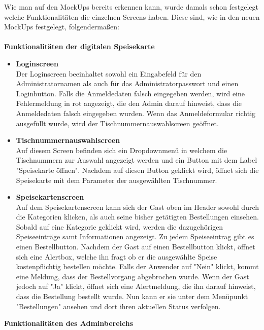 Wie man auf den MockUps bereits erkennen kann, wurde damals schon festgelegt welche Funktionalitäten die einzelnen Screens haben.
Diese sind, wie in den neuen MockUps festgelegt, folgendermaßen:\\ \\ 
\textbf{Funktionalitäten der digitalen Speisekarte}
\begin{itemize}
    \item \textbf{Loginscreen}\\
Der Loginscreen beeinhaltet sowohl ein Eingabefeld für den Administratornamen als auch für das Administratorpasswort und einen Loginbutton.
Falls die Anmeldedaten falsch eingegeben werden, wird eine Fehlermeldung in rot angezeigt, die den Admin darauf hinweist, dass die Anmeldedaten falsch eingegeben wurden.
Wenn das Anmeldeformular richtig ausgefüllt wurde, wird der Tischnummernauswahlscreen geöffnet.
    \item \textbf{Tischnummernauswahlscreen}\\
Auf diesem Screen befinden sich ein Dropdownmenü in welchem die Tischnummern zur Auswahl angezeigt werden und ein Button mit dem Label "Speisekarte öffnen". Nachdem auf diesen Button geklickt wird, öffnet sich die Speisekarte mit dem Parameter der ausgewählten Tischnummer.
    \item \textbf{Speisekartenscreen}\\
Auf dem Speisekartenscreen kann sich der Gast oben im Header sowohl durch die Kategorien klicken, als auch seine bisher getätigten Bestellungen einsehen. 
Sobald auf eine Kategorie geklickt wird, werden die dazugehörigen Speiseeinträge samt Informationen angezeigt. Zu jedem Speiseeintrag gibt es einen Bestellbutton. 
Nachdem der Gast auf einen Bestellbutton klickt, öffnet sich eine Alertbox, welche ihn fragt ob er die ausgewählte Speise kostenpflichtig bestellen möchte. Falls der Anwender auf "Nein" klickt, kommt eine Meldung, dass der Bestellvorgang abgebrochen wurde.
Wenn der Gast jedoch auf "Ja" klickt, öffnet sich eine Alertmeldung, die ihn darauf hinweist, dass die Bestellung bestellt wurde. Nun kann er sie unter dem Menüpunkt "Bestellungen" ansehen und dort ihren aktuellen Status verfolgen.\\
  \end{itemize}
\textbf{Funktionalitäten des Adminbereichs} 
